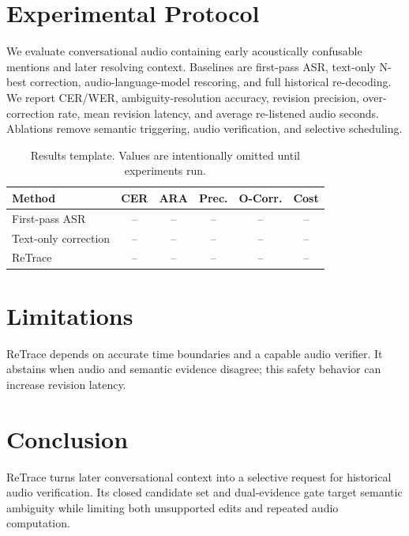 \documentclass[conference]{IEEEtran}
\begin{document}
\section{Experimental Protocol}
We evaluate conversational audio containing early acoustically confusable mentions and later resolving context. Baselines are first-pass ASR, text-only N-best correction, audio-language-model rescoring, and full historical re-decoding. We report CER/WER, ambiguity-resolution accuracy, revision precision, over-correction rate, mean revision latency, and average re-listened audio seconds. Ablations remove semantic triggering, audio verification, and selective scheduling.
\begin{table}[t]\caption{Results template. Values are intentionally omitted until experiments run.}\centering\begin{tabular}{lccccc}\toprule Method & CER & ARA & Prec. & O-Corr. & Cost\\\midrule First-pass ASR & -- & -- & -- & -- & --\\Text-only correction & -- & -- & -- & -- & --\\ReTrace & -- & -- & -- & -- & --\\\bottomrule\end{tabular}\end{table}
\section{Limitations}
ReTrace depends on accurate time boundaries and a capable audio verifier. It abstains when audio and semantic evidence disagree; this safety behavior can increase revision latency.
\section{Conclusion}
ReTrace turns later conversational context into a selective request for historical audio verification. Its closed candidate set and dual-evidence gate target semantic ambiguity while limiting both unsupported edits and repeated audio computation.


\end{document}
